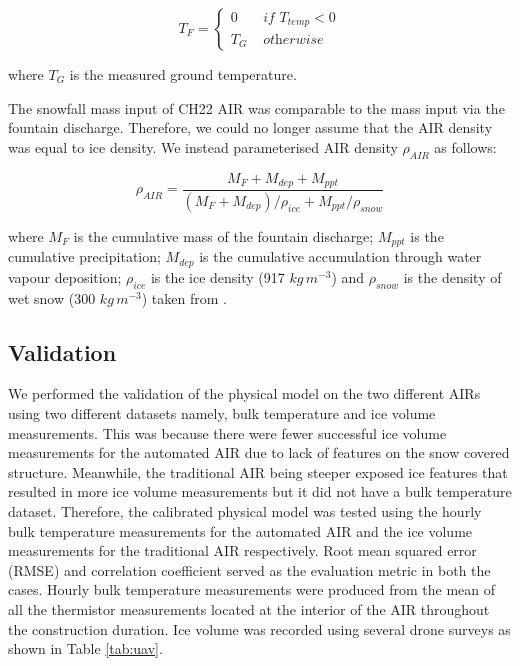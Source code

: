 \documentclass[tc, manuscript]{copernicus}
\begin{document}
\begin{equation}
	T_{F} = \left\{ \begin{array}{ll}
		0 & \textit{ if } T_{temp} < 0 \\
		T_{G} & \textit{ otherwise}
	\end{array} \right.
\end{equation}

where $T_{G}$ is the measured ground temperature.

The snowfall mass input of CH22 AIR was comparable to the mass input via the fountain discharge. Therefore, we
could no longer assume that the AIR density was equal to ice density. We instead parameterised AIR density
$\rho_{AIR}$ as follows:

\begin{equation}
  \rho_{AIR} = \frac{M_{F} + M_{dep} + M_{ppt}}{(M_{F} + M_{dep})/\rho_{ice} + M_{ppt}/\rho_{snow}}
\end{equation}

where $M_F$ is the cumulative mass of the fountain discharge; $M_{ppt}$ is the cumulative precipitation;
$M_{dep}$ is the cumulative accumulation through water vapour deposition; $\rho_{ice}$ is the ice density (917
$kg\,m^{-3}$) and $\rho_{snow}$ is the density of wet snow (300 $kg\,m^{-3}$) taken from
\cite{cuffeyPhysicsGlaciers2010} .

\subsection{Validation}
We performed the validation of the physical model on the two different AIRs using two different datasets namely,
bulk temperature and ice volume measurements. This was because there were fewer successful ice volume
measurements for the automated AIR due to lack of features on the snow covered structure. Meanwhile, the traditional
AIR being steeper exposed ice features that resulted in more ice volume measurements but it did not have a bulk
temperature dataset. Therefore, the calibrated physical model was tested using the hourly bulk temperature
measurements for the automated AIR and the ice volume measurements for the traditional AIR respectively. Root
mean squared error (RMSE) and correlation coefficient served as the evaluation metric in both the cases. Hourly
bulk temperature measurements were produced from the mean of all the thermistor measurements located at the
interior of the AIR throughout the construction duration. Ice volume was recorded using several drone surveys as
shown in Table \ref{tab:uav}.
\end{document}

